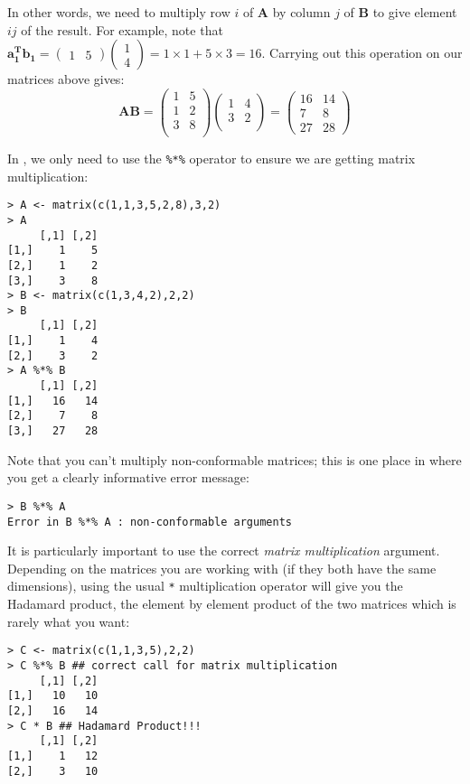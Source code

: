 In other words, we need to multiply row $i$ of $\boldsymbol{A}$ by column $j$ of $\boldsymbol{B}$ to give element $ij$ of the result.   For example, note that $\boldsymbol{a_{1}^T}\boldsymbol{b_{1}} = \left(\begin{array}{rr}1 & 5  \end{array}\right) \left( \begin{array}{r}1 \\4 \end{array}\right) = 1 \times 1 + 5 \times 3 = 16$.   Carrying out this operation on our matrices above gives:
\begin{displaymath}
\mathbf{AB} = 
\left( \begin{array}{rr}
1 & 5 \\
1 & 2 \\
3 & 8 \\
\end{array}
\right)
\left( \begin{array}{rr}
1 & 4 \\
3 & 2 \\
\end{array}
\right)
=
\left(
\begin{array}{rr}
 16 &  14\\
 7  &  8\\
 27 &  28
\end{array}
\right)
\end{displaymath}


In \R, we only need to use the \verb+%*%+ operator to ensure we are getting matrix multiplication:
\singlespacing
\begin{verbatim}
> A <- matrix(c(1,1,3,5,2,8),3,2)
> A
     [,1] [,2]
[1,]    1    5
[2,]    1    2
[3,]    3    8
> B <- matrix(c(1,3,4,2),2,2)
> B
     [,1] [,2]
[1,]    1    4
[2,]    3    2
> A %*% B
     [,1] [,2]
[1,]   16   14
[2,]    7    8
[3,]   27   28
\end{verbatim}
\onehalfspacing

Note that you can't multiply non-conformable matrices; this is one place in \R where you get a clearly informative error message:
\singlespacing
\begin{verbatim}
> B %*% A
Error in B %*% A : non-conformable arguments
\end{verbatim}
\onehalfspacing

It is particularly important to use the correct \emph{matrix multiplication} argument.   Depending on the matrices you are working with (if they both have the same dimensions), using the usual \verb+*+ multiplication operator will give you the Hadamard product, the element by element product of the two matrices which is rarely what you want:
\singlespacing
\begin{verbatim}
> C <- matrix(c(1,1,3,5),2,2)
> C %*% B ## correct call for matrix multiplication
     [,1] [,2]
[1,]   10   10
[2,]   16   14
> C * B ## Hadamard Product!!!
     [,1] [,2]
[1,]    1   12
[2,]    3   10
\end{verbatim}
\onehalfspacing



